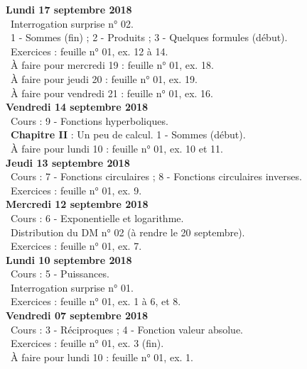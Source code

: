 \documentclass[12pt,a4paper]{article}
\begin{document}
\noindent\textbf{\bf Lundi 17 septembre 2018}\\ 
\bu\ Interrogation surprise n° 02.\\
\bu\ 1 - Sommes (fin) ; 2 - Produits ; 3 - Quelques formules (début).\\
\bu\ Exercices : feuille n° 01, ex. 12 à 14.\\
\bu\ À faire pour mercredi 19 : feuille n° 01, ex. 18.\\
\bu\ À faire pour jeudi 20 : feuille n° 01, ex. 19.\\
\bu\ À faire pour vendredi 21 : feuille n° 01, ex. 16.\vspace{.4cm}\\

\noindent\textbf{Vendredi 14 septembre 2018}\\
\bu\ Cours : 9 - Fonctions hyperboliques.\\
\bu\ \textbf{Chapitre II} \rm : Un peu de calcul. 1 - Sommes (début).\\
\bu\ À faire pour lundi 10 : feuille n° 01, ex. 10 et 11.\vspace{.4cm}\\

\noindent\textbf{\bf Jeudi 13 septembre 2018}\\
\bu\ Cours : 7 - Fonctions circulaires ; 8 - Fonctions circulaires inverses.\\
\bu\ Exercices : feuille n° 01, ex. 9.\vspace{.4cm}\\
    
\noindent\textbf{\bf Mercredi 12 septembre 2018}\\
\bu\ Cours : 6 - Exponentielle et logarithme.\\
\bu\ Distribution du DM n° 02 (à rendre le 20 septembre).\\
\bu\ Exercices : feuille n° 01, ex. 7.\vspace{.4cm}\\

\noindent\textbf{\bf Lundi 10 septembre 2018}\\
\bu\ Cours : 5 - Puissances.\\
\bu\ Interrogation surprise n° 01.\\
\bu\ Exercices : feuille n° 01, ex. 1 à 6, et 8.\vspace{.4cm}\\

\noindent\textbf{Vendredi 07 septembre 2018}\\
\bu\ Cours : 3 - Réciproques ; 4 - Fonction valeur absolue.\\
\bu\ Exercices : feuille n° 01, ex. 3 (fin).\\
\bu\ À faire pour lundi 10 : feuille n° 01, ex. 1.\vspace{.4cm}\\
\end{document}
